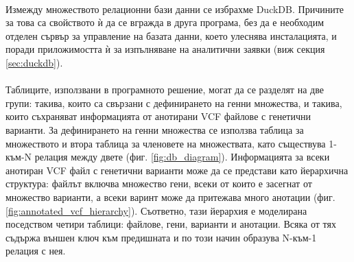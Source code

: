 \documentclass[pdftex,cyrillic,14pt,a4page,twoside,openright]{extreport}
\begin{document}
\paragraph{}
Измежду множеството релационни бази данни се избрахме DuckDB. Причините за това са свойството ѝ да се вгражда в друга програма, без да е необходим отделен сървър за управление на базата данни, което улеснява инсталацията, и поради приложимостта ѝ за изпълняване на аналитични заявки (виж секция \ref{sec:duckdb}).

\paragraph{}
Таблиците, използвани в програмното решение, могат да се разделят на две групи: такива, които са свързани с дефинирането на генни множества, и такива, които съхраняват информацията от анотирани VCF файлове с генетични варианти. За дефинирането на генни множества се използва таблица за множеството и втора таблица за членовете на множествата, като съществува 1-към-N релация между двете (фиг. \ref{fig:db_diagram}). Информацията за всеки анотиран VCF файл с генетични варианти може да се представи като йерархична структура: файлът включва множество гени, всеки от които е засегнат от множество варианти, а всеки варинт може да притежава много анотации (фиг. \ref{fig:annotated_vcf_hierarchy}). Съответно, тази йерархия е моделирана поседством четири таблици: файлове, гени, варианти и анотации. Всяка от тях съдържа външен ключ към предишната и по този начин образува N-към-1 релация с нея.
\end{document}
